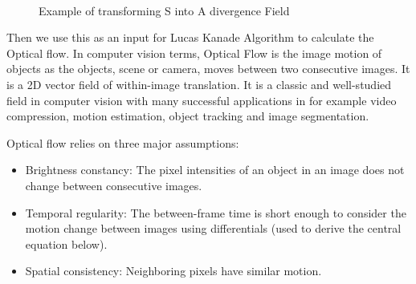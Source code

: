 \begin{figure}[h]
\begin{dBox}
\centering
  \mbox{
   }
   \caption{Example of transforming S into A divergence Field \label{fig:dynamic345} }   
\end{dBox}   
\end{figure}
\bigskip

Then we use this as an input for Lucas Kanade Algorithm to calculate the Optical flow. In computer vision terms, Optical Flow is the image motion of objects as the objects, scene or camera, moves between two consecutive images. It is a 2D vector field of within-image translation. It is a classic and well-studied field in computer vision with many successful applications in for example video compression, motion estimation, object tracking and image segmentation.\bigskip

Optical flow relies on three major assumptions:
\begin{itemize}
\item 	Brightness constancy: The pixel intensities of an object in an image does not change between consecutive images.

\item  Temporal regularity: The between-frame time is short enough to consider the motion change between images using differentials (used to derive the central equation below).

\item  Spatial consistency: Neighboring pixels have similar motion.
\end{itemize}

